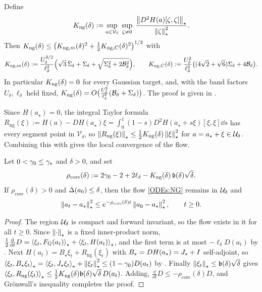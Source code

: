 \begin{lemma}
\label{lem:Kng}
Define
\[
    K_{\mathrm{ng}}(\delta):=\sup_{a\in\mathcal V_\delta}\;\sup_{\zeta\neq0}\;
    \frac{\left\lVert D^2H(a)[\zeta,\zeta]\right\rVert_\star}{\left\lVert \zeta\right\rVert_\star^2}.
\]
Then $K_{\mathrm{ng}}(\delta)\leq\bigl(K_{\mathrm{ng},m}(\delta)^2+\tfrac12K_{\mathrm{ng},C}(\delta)^2\bigr)^{1/2}$
with
\[
    K_{\mathrm{ng},m}(\delta):=\frac{U_\delta^{3/2}}{\ell_\delta^2}
    \Bigl(\sqrt3\,\bar\Sigma_\delta+\Sigma_\delta+\sqrt{\Sigma_\delta^2+2\mathcal B_\delta^2}\Bigr),
    \qquad
    K_{\mathrm{ng},C}(\delta):=\frac{U_\delta^2}{\ell_\delta^2}
    \bigl((4\sqrt2+\sqrt6)\Sigma_\delta+4\mathcal B_\delta\bigr).
\]
In particular $K_{\mathrm{ng}}(\delta)=0$ for every Gaussian target, and, with the band factors
$U_\delta,\ell_\delta$ held fixed,
$K_{\mathrm{ng}}(\delta)=O\bigl(\tfrac{U_\delta^2}{\ell_\delta^2}(\mathcal B_\delta+\Sigma_\delta)\bigr)$.
The proof is given in .
\end{lemma}

Since $H(a_\star)=0$, the integral Taylor formula
$R_{\mathrm{ng}}(\xi):=H(a)-DH(a_\star)\xi=\int_0^1(1-s)D^2H(a_\star+s\xi)[\xi,\xi]\dd s$ has
every segment point in $\mathcal V_\delta$, so
$\left\lVert R_{\mathrm{ng}}(\xi)\right\rVert_\star\leq\tfrac12K_{\mathrm{ng}}(\delta)\left\lVert \xi\right\rVert_\star^2$ for
$a=a_\star+\xi\in\mathcal{U}_\delta$. Combining this with  gives the local
convergence of the flow.

\begin{theorem}
\label{thm:loc-flow}
Let $0<\gamma_0\leq\gamma_\star$ and $\delta>0$, and set
\begin{equation}
\label{eq:rho-core}
    \rho_{\mathrm{core}}(\delta):=2\gamma_0-2+2\ell_\delta-K_{\mathrm{ng}}(\delta)\,\mathfrak b(\delta)\sqrt\delta .
\end{equation}
If $\rho_{\mathrm{core}}(\delta)>0$ and $\Delta(a_0)\leq\delta$, then the flow \eqref{ODEs:NG}
remains in $\mathcal{U}_\delta$ and
\[
    \left\lVert a_t-a_\star\right\rVert_\star^2\leq e^{-\rho_{\mathrm{core}}(\delta)t}\left\lVert a_0-a_\star\right\rVert_\star^2,
    \qquad t\geq0 .
\]
\end{theorem}

\begin{proof}
The region $\mathcal{U}_\delta$ is compact and forward invariant, so the flow exists in it for all
$t\geq0$. Since $\left\lVert \cdot\right\rVert_\star$ is a fixed inner-product norm,
$\tfrac12\tfrac{\mathrm{d}}{\mathrm{d} t}D=\left\langle \xi_t,F_{\mathrm G}(a_t)\right\rangle_\star+\left\langle \xi_t,H(a_t)\right\rangle_\star$,
and the first term is at most $-\ell_\delta D(a_t)$ by . Next
$H(a_t)=B_\star\xi_t+R_{\mathrm{ng}}(\xi_t)$ with $B_\star=DH(a_\star)=J_\star+I$
self-adjoint, so
$\left\langle \xi_t,B_\star\xi_t\right\rangle_\star=\left\langle \xi_t,J_\star\xi_t\right\rangle_\star+\left\lVert \xi_t\right\rVert_\star^2\leq(1-\gamma_0)D(a_t)$
by . Finally
$\left\lVert \xi_t\right\rVert_\star\leq\mathfrak b(\delta)\sqrt\delta$ gives
$\left\langle \xi_t,R_{\mathrm{ng}}(\xi_t)\right\rangle_\star\leq\tfrac12K_{\mathrm{ng}}(\delta)\mathfrak b(\delta)\sqrt\delta\,D(a_t)$.
Adding, $\tfrac{\dd}{\dd t}D\leq-\rho_{\mathrm{core}}(\delta)D$, and Gr\"onwall's inequality
completes the proof.
\end{proof}


